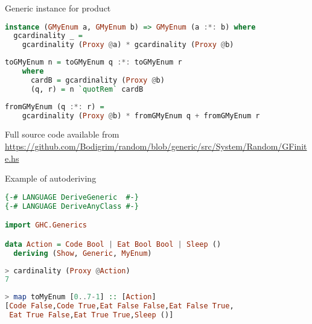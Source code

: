 \documentclass[handout]{beamer}
\begin{document}
\begin{frame}[fragile]{Generic instance for product}

\begin{lstlisting}[language=Haskell]
instance (GMyEnum a, GMyEnum b) => GMyEnum (a :*: b) where
  gcardinality _ =
    gcardinality (Proxy @a) * gcardinality (Proxy @b)
\end{lstlisting} \pause
\begin{lstlisting}[language=Haskell]
  toGMyEnum n = toGMyEnum q :*: toGMyEnum r
    where
      cardB = gcardinality (Proxy @b)
      (q, r) = n `quotRem` cardB
\end{lstlisting} \pause
\begin{lstlisting}[language=Haskell]
  fromGMyEnum (q :*: r) =
    gcardinality (Proxy @b) * fromGMyEnum q + fromGMyEnum r

\end{lstlisting}

\bigskip\pause

Full source code available from
\url{https://github.com/Bodigrim/random/blob/generic/src/System/Random/GFinite.hs}

\end{frame}

\begin{frame}[fragile]{Example of autoderiving}

\begin{lstlisting}[language=Haskell]
{-# LANGUAGE DeriveGeneric  #-}
{-# LANGUAGE DeriveAnyClass #-}

import GHC.Generics

data Action = Code Bool | Eat Bool Bool | Sleep ()
  deriving (Show, Generic, MyEnum)
\end{lstlisting} \pause
\begin{lstlisting}[language=Haskell]
> cardinality (Proxy @Action)
7
\end{lstlisting} \pause
\begin{lstlisting}[language=Haskell]
> map toMyEnum [0..7-1] :: [Action]
[Code False,Code True,Eat False False,Eat False True,
 Eat True False,Eat True True,Sleep ()]
\end{lstlisting}

\end{frame}
\end{document}
